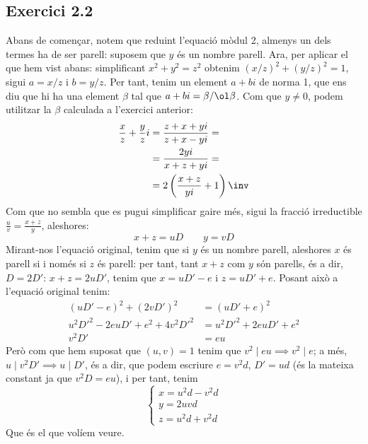 \documentclass[11pt, a4paper]{article}
\begin{document}
    \subsection{Exercici 2.2}
    Abans de començar, notem que reduint l'equació mòdul 2, almenys un dels termes ha de ser parell: suposem que $y$ és un nombre parell. Ara, per aplicar el que hem vist abans: simplificant $x^2+y^2=z^2$ obtenim $(x/z)^2+(y/z)^2=1$, sigui $a=x/z$ i $b=y/z$. Per tant, tenim un element $a+bi$ de norma 1, que ens diu que hi ha una element $\beta$ tal que $a+bi=\beta/\ol\beta$. Com que $y\neq0$, podem utilitzar la $\beta$ calculada a l'exercici anterior:
    \begin{align*}
        \frac{x}{z}+\frac{y}{z}i&=\frac{z+x+yi}{z+x-yi}=\\
        &=\frac{2yi}{x+z+yi}=\\
        &=2\left(\frac{x+z}{yi}+1\right)\inv
    \end{align*}
    Com que no sembla que es pugui simplificar gaire més, sigui la fracció irreductible $\frac{u}{v}=\frac{x+z}{y}$, aleshores:
    \[
        x+z=uD\qquad y=vD
    \]
    Mirant-nos l'equació original, tenim que si $y$ és un nombre parell, aleshores $x$ és parell si i només si $z$ és parell: per tant, tant $x+z$ com $y$ són parells, és a dir, $D=2D'$: $x+z = 2uD'$, tenim que $x=uD'-e$ i $z=uD'+e$. Posant això a l'equació original tenim:
    \begin{align*}
        (uD'-e)^2+(2vD')^2&=(uD'+e)^2\\
        u^2D'^2-2euD'+e^2+4v^2D'^2&=u^2D'^2+2euD'+e^2\\
        v^2D'&=eu
    \end{align*}
    Però com que hem suposat que $(u,v)=1$ tenim que $v^2\mid eu\implies v^2\mid e$; a més, $u\mid v^2D'\implies u\mid D'$, és a dir, que podem escriure $e=v^2d$, $D'=ud$ (és la mateixa constant ja que $v^2D = eu$), i per tant, tenim
    \[
        \begin{cases}
            x = u^2d-v^2d\\
            y = 2uvd\\
            z = u^2d+v^2d
        \end{cases} 
    \]
    Que és el que volíem veure.
\end{document}
